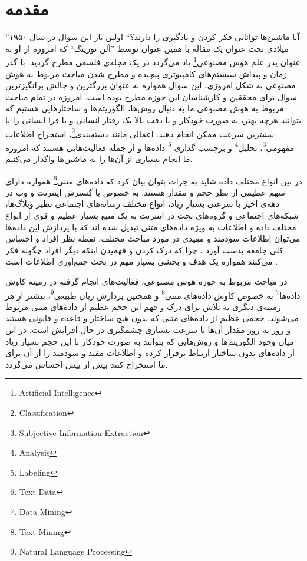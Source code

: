 \setcounter{page}{2}
\chapter{مقدمه}
\label{chap1}
''آیا ماشین‌ها توانایی فکر کردن و یادگیری را دارند؟`` اولین بار این سوال در سال ۱۹۵۰ میلادی تحت عنوان یک مقاله با همین عنوان توسط ''آلن تورینگ`` 
که امروزه از او به عنوان پدر علم هوش مصنوعی\footnote{Artificial Intelligence}
یاد می‌‌گردد در یک مجله‌ی فلسفی‌ مطرح گردید. با گذر زمان و پیداش سیستم‌های کامپیوتری پیچیده و مطرح شدن مباحث مربوط به هوش مصنوعی به شکل امروزی، این سوال همواره به عنوان بزرگترین و چالش برانگیزترین سوال برای محققین و کارشناسان این حوزه مطرح بوده است. امروزه در تمام مباحث مربوط به هوش مصنوعی ما به دنبال روش‌ها، الگوریتم‌ها و ساختارهایی هستیم که بتوانند هرچه بهتر، به صورت خودکار و با دقت بالا یک  رفتار انسانی‌ و یا فرا انسانی‌ را با بیشترین سرعت ممکن انجام دهند. اعمالی مانند دسته‌بندی\footnote{Classification}،
 استخراج اطلاعات مفهومی‌\footnote{Subjective Information Extraction}،
  تحلیل\footnote{Analysis}
   و برچسب گذاری \footnote{Labeling}
   داده‌ها و از جمله فعالیت‌هایی‌ هستند که امروزه ما انجام بسیاری از آن‌ها را به ماشین‌ها واگذار می‌‌کنیم. 

در بین انواع مختلف داده شاید به جرات بتوان بیان کرد که داده‌های متنی\footnote{Text Data}
همواره  دارای سهم عظیمی‌ از نظر حجم و مقدار هستند. به خصوص با گسترش اینترنت  و وب در دهه‌ی اخیر با سرعتی‌ بسیار زیاد، انواع مختلف رسانه‌های اجتماعی نظیر وبلاگ‌ها، شبکه‌های اجتماعی و گروه‌های بحث در اینترنت به یک منبع بسیار عظیم و قوی از انواع مختلف داده و اطلاعات به  ویژه داده‌‌های  متنی تبدیل شده اند که با پردازش این داده‌ها می‌‌توان اطلاعات سودمند و مفیدی در مورد مباحث مختلف، نقطه نظر افراد و احساس کلی‌ جامعه بدست آورد
\cite{lin2012weakly}،
چرا که درک کردن و فهمیدن اینکه دیگر افراد چگونه فکر می‌‌کنند همواره یک هدف و بخشی بسیار مهم در بحث جمع‌آوری اطلاعات است
\cite{pang2008opinion}.

در مباحث مربوط به حوزه هوش مصنوعی، فعالیت‌های انجام گرفته در زمینه کاوش داده‌ها\footnote{Data Mining}
به خصوص کاوش داده‌های متنی\footnote{Text Mining}
و همچنین پردازش زبان طبیعی\footnote{Natural Language Processing}،
 بیشتر از هر زمینه‌ی دیگری به تلاش برای درک و فهم این حجم عظیم از داده‌های متنی مربوط می‌‌شوند. حجمی عظیم از داده‌های متنی که بدون هیچ ساختار و قاعده و قانونی‌ هستند و روز به روز مقدار آن‌ها با سرعت بسیاری چشمگیری در حال افزایش است. در این میان وجود الگوریتم‌ها و روش‌هایی که بتوانند به صورت خودکار با این حجم بسیار زیاد از داده‌های بدون ساختار ارتباط برقرار کرده و اطلاعات مفید و سودمند را از آن برای ما استخراج کنند بیش از پیش احساس می‌‌گردد.

